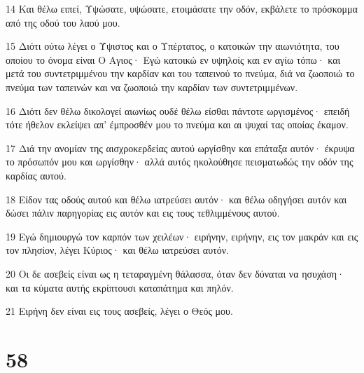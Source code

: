 \par 14 Και θέλω ειπεί, Υψώσατε, υψώσατε, ετοιμάσατε την οδόν, εκβάλετε το πρόσκομμα από της οδού του λαού μου.
\par 15 Διότι ούτω λέγει ο Ύψιστος και ο Υπέρτατος, ο κατοικών την αιωνιότητα, του οποίου το όνομα είναι Ο Αγιος· Εγώ κατοικώ εν υψηλοίς και εν αγίω τόπω· και μετά του συντετριμμένου την καρδίαν και του ταπεινού το πνεύμα, διά να ζωοποιώ το πνεύμα των ταπεινών και να ζωοποιώ την καρδίαν των συντετριμμένων.
\par 16 Διότι δεν θέλω δικολογεί αιωνίως ουδέ θέλω είσθαι πάντοτε ωργισμένος· επειδή τότε ήθελον εκλείψει απ' έμπροσθέν μου το πνεύμα και αι ψυχαί τας οποίας έκαμον.
\par 17 Διά την ανομίαν της αισχροκερδείας αυτού ωργίσθην και επάταξα αυτόν· έκρυψα το πρόσωπόν μου και ωργίσθην· αλλά αυτός ηκολούθησε πεισματωδώς την οδόν της καρδίας αυτού.
\par 18 Είδον τας οδούς αυτού και θέλω ιατρεύσει αυτόν· και θέλω οδηγήσει αυτόν και δώσει πάλιν παρηγορίας εις αυτόν και εις τους τεθλιμμένους αυτού.
\par 19 Εγώ δημιουργώ τον καρπόν των χειλέων· ειρήνην, ειρήνην, εις τον μακράν και εις τον πλησίον, λέγει Κύριος· και θέλω ιατρεύσει αυτόν.
\par 20 Οι δε ασεβείς είναι ως η τεταραγμένη θάλασσα, όταν δεν δύναται να ησυχάση· και τα κύματα αυτής εκρίπτουσι καταπάτημα και πηλόν.
\par 21 Ειρήνη δεν είναι εις τους ασεβείς, λέγει ο Θεός μου.

\chapter{58}

